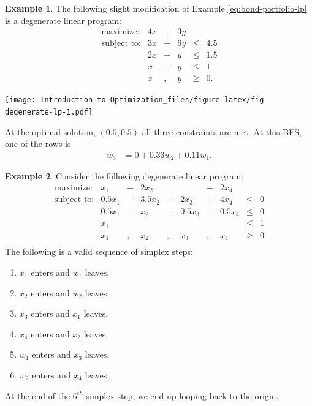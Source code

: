 \documentclass[
]{book}
\providecommand{\tightlist}{%
  \setlength{\itemsep}{0pt}\setlength{\parskip}{0pt}}
\theoremstyle{definition}
\theoremstyle{definition}
\newtheorem{example}{Example}[chapter]
\theoremstyle{definition}
\theoremstyle{definition}
\theoremstyle{remark}
\begin{document}
\begin{example}
The following slight modification of Example \eqref{eq:bond-portfolio-lp} is a degenerate linear program:
\begin{equation*}
  \begin{array}{rrrrrl}
  \mbox{maximize:} & 4x & + & 3y \\
  \mbox{subject to:}
    & 3x & + & 6y & \le & 4.5 \\
    & 2x & + & y & \le & 1.5 \\
    & x & + & y & \le & 1 \\
    & x & , & y & \ge & 0.
  \end{array}
\end{equation*}

\texttt{[image: Introduction-to-Optimization\_files/figure-latex/fig-degenerate-lp-1.pdf]}

At the optimal solution, \((0.5, 0.5)\) all three constraints are met. At this BFS, one of the rows is
\begin{align}
  w_3 &= 0 + 0.33 w_2 + 0.11 w_1.
\end{align}
\end{example}

\begin{example}
\protect\hypertarget{exm:cycling}{}\label{exm:cycling}Consider the following degenerate linear program:
\begin{equation*}
  \begin{array}{rrrrrrrrrl}
  \mbox{maximize:} & x_1 & - & 2x_2 & & & - & 2x_4 \\
  \mbox{subject to:}
    & 0.5 x_1 & - & 3.5x_2 & - & 2x_3 & + & 4 x_4 & \le & 0 \\
    & 0.5 x_1 & - & x_2 & - & 0.5 x_3 & + & 0.5 x_4 & \le & 0 \\
    & x_1 & & & & &  &  & \le & 1 \\
    & x_1 & , & x_2 & , & x_3 & , & x_4 & \ge & 0 \\
  \end{array}
\end{equation*}
The following is a valid sequence of simplex steps:

\begin{enumerate}
\def\labelenumi{\arabic{enumi}.}
\tightlist
\item
  \(x_1\) enters and \(w_1\) leaves,
\item
  \(x_2\) enters and \(w_2\) leaves,
\item
  \(x_3\) enters and \(x_1\) leaves,
\item
  \(x_4\) enters and \(x_2\) leaves,
\item
  \(w_1\) enters and \(x_3\) leaves,
\item
  \(w_2\) enters and \(x_4\) leaves.
\end{enumerate}

At the end of the \(6^{th}\) simplex step, we end up looping back to the origin.
\end{example}
\end{document}
